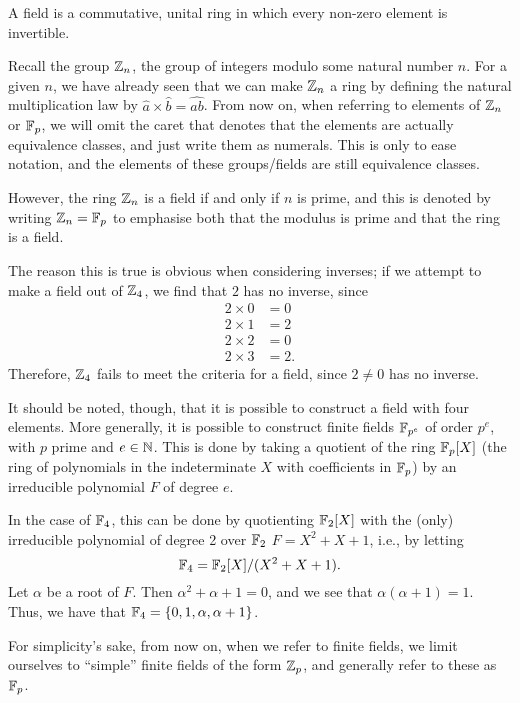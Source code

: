 \begin{definition}
	A field is a commutative, unital ring in which every non-zero element is invertible.
\end{definition}
Recall the group $\zn$, the group of integers modulo some natural number $n$.
For a given $n$, we have already seen that we can make $\zn$ a ring by defining the natural multiplication law by $\widehat{a} \times \widehat{b} = \widehat{ab}$.
From now on, when referring to elements of $\zn$ or $\fp$, we will omit the caret that denotes that the elements are actually equivalence classes, and just write them as numerals.
This is only to ease notation, and the elements of these groups/fields are still equivalence classes.

However, the ring $\zn$ is a field if and only if $n$ is prime, and this is denoted by writing $\zn = \fp$ to emphasise both that the modulus is prime and that the ring is a field.

The reason this is true is obvious when considering inverses; if we attempt to make a field out of $\zn[4]$, we find that $2$ has no inverse, since
\begin{align*}
	2 \times 0 &= 0\\
	2 \times 1 &= 2\\
	2 \times 2 &= 0\\
	2 \times 3 &= 2.
\end{align*}
Therefore, $\zn[4]$ fails to meet the criteria for a field, since $2\neq 0$ has no inverse.

It should be noted, though, that it is possible to construct a field with four elements.
More generally, it is possible to construct finite fields $\fp[p^e]$ of order $p^e$, with $p$ prime and $e \in \N$.
This is done by taking a quotient of the ring $\fp[p] [X]$ (the ring of polynomials in the indeterminate $X$ with coefficients in $\fp$) by an irreducible polynomial $F$ of degree $e$.

In the case of $\fp[4]$, this can be done by quotienting $\fp[2] [X]$ with the (only) irreducible polynomial of degree 2 over $\fp[2]$ $F = X^2+X+1$, i.e., by letting
$$\fp[4] = \fp[2] [X] / (X^2 + X + 1).$$
Let $\alpha$ be a root of $F$.
Then $\alpha^2 + \alpha + 1 = 0$, and we see that $\alpha(\alpha +1) = 1$.
Thus, we have that $\fp[4] = \{0, 1, \alpha, \alpha + 1\}$.

For simplicity's sake, from now on, when we refer to finite fields, we limit ourselves to ``simple'' finite fields of the form $\zn[p]$, and generally refer to these as $\fp$.

